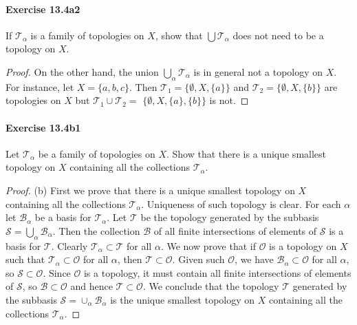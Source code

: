 \documentclass{article}
\begin{document}
\paragraph{Exercise 13.4a2} If $\mathcal{T}_\alpha$ is a family of topologies on $X$, show that $\bigcup \mathcal{T}_\alpha$ does not need to be a topology on $X$.
\begin{proof}
    On the other hand, the union $\bigcup_\alpha \mathcal{T}_\alpha$ is in general not a topology on $X$. For instance, let $X=\{a, b, c\}$. Then $\mathcal{T}_1=\{\emptyset, X,\{a\}\}$ and $\mathcal{T}_2=\{\emptyset, X,\{b\}\}$ are topologies on $X$ but $\mathcal{T}_1 \cup \mathcal{T}_2=$ $\{\emptyset, X,\{a\},\{b\}\}$ is not.
\end{proof}



\paragraph{Exercise 13.4b1} Let $\mathcal{T}_\alpha$ be a family of topologies on $X$. Show that there is a unique smallest topology on $X$ containing all the collections $\mathcal{T}_\alpha$.
\begin{proof}
    (b) First we prove that there is a unique smallest topology on $X$ containing all the collections $\mathcal{T}_\alpha$. Uniqueness of such topology is clear. For each $\alpha$ let $\mathcal{B}_\alpha$ be a basis for $\mathcal{T}_\alpha$. Let $\mathcal{T}$ be the topology generated by the subbasis $\mathcal{S}=\bigcup_\alpha \mathcal{B}_\alpha$. Then the collection $\mathcal{B}$ of all finite intersections of elements of $\mathcal{S}$ is a basis for $\mathcal{T}$. Clearly $\mathcal{T}_\alpha \subset \mathcal{T}$ for all $\alpha$. We now prove that if $\mathcal{O}$ is a topology on $X$ such that $\mathcal{T}_\alpha \subset \mathcal{O}$ for all $\alpha$, then $\mathcal{T} \subset \mathcal{O}$. Given such $\mathcal{O}$, we have $\mathcal{B}_\alpha \subset \mathcal{O}$ for all $\alpha$, so $\mathcal{S} \subset \mathcal{O}$. Since $\mathcal{O}$ is a topology, it must contain all finite intersections of elements of $\mathcal{S}$, so $\mathcal{B} \subset \mathcal{O}$ and hence $\mathcal{T} \subset \mathcal{O}$. We conclude that the topology $\mathcal{T}$ generated by the subbasis $\mathcal{S}=\cup_\alpha \mathcal{B}_\alpha$ is the unique smallest topology on $X$ containing all the collections $\mathcal{T}_\alpha$.
\end{proof}
\end{document}
